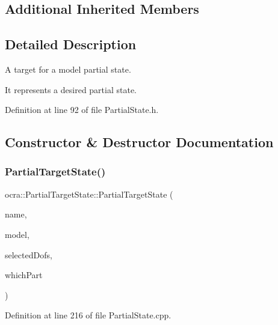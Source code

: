 \subsection*{Additional Inherited Members}


\subsection{Detailed Description}
A target for a model partial state. 

It represents a desired partial state. 

Definition at line 92 of file Partial\+State.\+h.



\subsection{Constructor \& Destructor Documentation}
\hypertarget{classocra_1_1PartialTargetState_a2aed8d7e02fa12907eb218449afc6422}{}\label{classocra_1_1PartialTargetState_a2aed8d7e02fa12907eb218449afc6422} 
\subsubsection{\texorpdfstring{Partial\+Target\+State()}{PartialTargetState()}}
{\footnotesize\ttfamily ocra\+::\+Partial\+Target\+State\+::\+Partial\+Target\+State (\begin{DoxyParamCaption}\item[{const std\+::string \&}]{name,  }\item[{const \hyperlink{classocra_1_1Model}{Model} \&}]{model,  }\item[{const Eigen\+::\+Vector\+Xi \&}]{selected\+Dofs,  }\item[{int}]{which\+Part }\end{DoxyParamCaption})}



Definition at line 216 of file Partial\+State.\+cpp.

\hypertarget{classocra_1_1PartialTargetState_a32d63501a917b40728387258cb1e06d1}{}\label{classocra_1_1PartialTargetState_a32d63501a917b40728387258cb1e06d1} 

